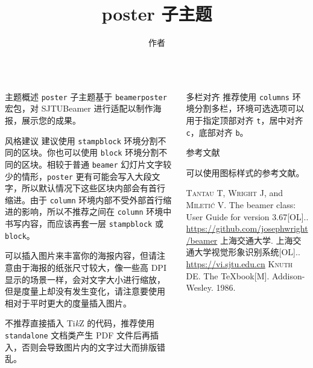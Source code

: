 \documentclass{ctexbeamer}
\begin{document}
  \title{poster 子主题}
  \author{作者}
  \logo{\zhlogo}
  \begin{frame}[fragile]
    \begin{columns}[T]
      \begin{column}{.45\textwidth}

        \begin{stampblock}{主题概述}
          \texttt{poster} 子主题基于 \texttt{beamerposter} 宏包\cite{beamerposter}，对 SJTUBeamer 进行适配以制作海报，展示您的成果。
        \end{stampblock}

        \begin{stampblock}{风格建议}
          建议使用 \texttt{stampblock} 环境分割不同的区块。你也可以使用 \texttt{block} 环境分割不同的区块。相较于普通 \texttt{beamer} 幻灯片文字较少的情形，\texttt{poster} 更有可能会写入大段文字，所以默认情况下这些区块内部会有首行缩进。由于 \texttt{column} 环境内部不受外部首行缩进的影响，所以不推荐之间在 \texttt{column} 环境中书写内容，而应该再套一层 \texttt{stampblock} 或 \texttt{block}。
          
          可以插入图片来丰富你的海报内容，但请注意由于海报的纸张尺寸较大，像一些高 DPI 显示的场景一样，会对文字大小进行缩放，但是度量上却没有发生变化，请注意要使用相对于平时更大的度量插入图片。

          不推荐直接插入 Ti\emph{k}Z 的代码，推荐使用 \texttt{standalone} 文档类产生 PDF 文件后再插入，否则会导致图片内的文字过大而排版错乱。
        \end{stampblock}

      \end{column}
      \begin{column}{.45\textwidth}
        
        \begin{stampblock}{多栏对齐}
          推荐使用 \texttt{columns} 环境分割多栏，环境可选选项可以用于指定顶部对齐 \texttt{t}，居中对齐 \texttt{c}，底部对齐 \texttt{b}。
        \end{stampblock}
        
        
        \begin{stampblock}{参考文献}
        
          可以使用图标样式的参考文献。

          \begin{bibliolist}{00}
            \onlineitem \textsc{Tantau T}, \textsc{Wright J}, and \textsc{Mileti\'c V}.\newblock
            The beamer class: User Guide for version 3.67[OL].. \url{https://github.com/josephwright/beamer}
            \articleitem \textsc{上海交通大学}.\newblock
            上海交通大学视觉形象识别系统[OL].. \url{https://vi.sjtu.edu.cn}
            \bookitem \textsc{Knuth DE}.\newblock
            The \TeX{}book[M].\newblock
            Addison-Wesley. 1986.
          \end{bibliolist}


\end{stampblock}
\end{column}
\end{columns}
\end{frame}
\end{document}
